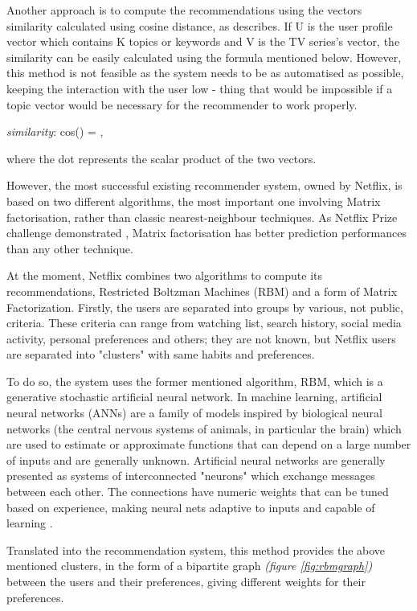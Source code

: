 Another approach is to compute the recommendations using the vectors similarity calculated using cosine distance, as \cite{Cosinus} describes. If U is the user profile vector which contains K topics or keywords and V is the TV series's vector, the similarity can be easily calculated using the formula mentioned below. However, this method is not feasible as the system needs to be as automatised as possible, keeping the interaction with the user low - thing that would be impossible if a topic vector would be necessary for the recommender to work properly.

\textit{similarity}: cos(\theta) = ,

where the dot represents the scalar product of the two vectors.

However, the most successful existing recommender system, owned by Netflix, is based on two different algorithms, the most important one involving Matrix factorisation, rather than classic nearest-neighbour techniques. As Netflix Prize challenge demonstrated \cite{np}, Matrix factorisation has better prediction performances than any other technique.

At the moment, Netflix combines two algorithms to compute its recommendations, Restricted Boltzman Machines (RBM) and a form of Matrix Factorization. Firstly, the users are separated into groups by various, not public, criteria. These criteria can range from watching list, search history, social media activity, personal preferences and others; they are not known, but Netflix users are separated into "clusters" with same habits and preferences.

To do so, the system uses the former mentioned algorithm, RBM, which is a generative stochastic artificial neural network. In machine learning, artificial neural networks (ANNs) are a family of models inspired by biological neural networks (the central nervous systems of animals, in particular the brain) which are used to estimate or approximate functions that can depend on a large number of inputs and are generally unknown. Artificial neural networks are generally presented as systems of interconnected "neurons" which exchange messages between each other. The connections have numeric weights that can be tuned based on experience, making neural nets adaptive to inputs and capable of learning \cite{Neural}.

Translated into the recommendation system, this method provides the above mentioned clusters, in the form of a bipartite graph \textit{(figure \ref{fig:rbmgraph})} between the users and their preferences, giving different weights for their preferences. 

